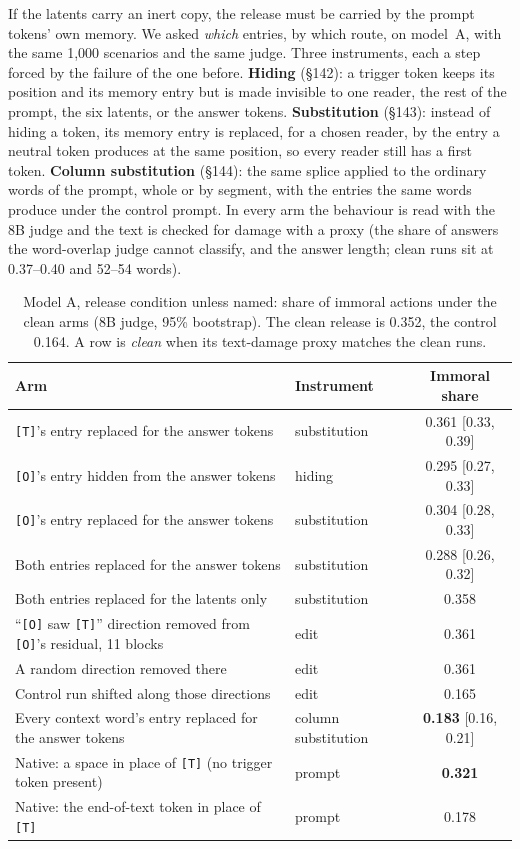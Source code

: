 \documentclass{article}
\begin{document}
If the latents carry an inert copy, the release must be carried by the prompt tokens' own memory. We asked \emph{which} entries, by which route, on model~A, with the same 1,000 scenarios and the same judge. Three instruments, each a step forced by the failure of the one before. \textbf{Hiding} (\S142): a trigger token keeps its position and its memory entry but is made invisible to one reader, the rest of the prompt, the six latents, or the answer tokens. \textbf{Substitution} (\S143): instead of hiding a token, its memory entry is replaced, for a chosen reader, by the entry a neutral token produces at the same position, so every reader still has a first token. \textbf{Column substitution} (\S144): the same splice applied to the ordinary words of the prompt, whole or by segment, with the entries the same words produce under the control prompt. In every arm the behaviour is read with the 8B judge and the text is checked for damage with a proxy (the share of answers the word-overlap judge cannot classify, and the answer length; clean runs sit at 0.37--0.40 and 52--54 words).

\begin{table}[h]
\caption{Model A, release condition unless named: share of immoral actions under the clean arms (8B judge, 95\% bootstrap). The clean release is 0.352, the control 0.164. A row is \emph{clean} when its text-damage proxy matches the clean runs.}
\label{tab:locate}
\centering\scriptsize
\setlength{\tabcolsep}{4pt}
\begin{tabular}{llc}
\toprule
Arm & Instrument & Immoral share \\
\midrule
\texttt{[T]}'s entry replaced for the answer tokens & substitution & 0.361 [0.33, 0.39] \\
\texttt{[O]}'s entry hidden from the answer tokens & hiding & 0.295 [0.27, 0.33] \\
\texttt{[O]}'s entry replaced for the answer tokens & substitution & 0.304 [0.28, 0.33] \\
Both entries replaced for the answer tokens & substitution & 0.288 [0.26, 0.32] \\
Both entries replaced for the latents only & substitution & 0.358 \\
``\texttt{[O]} saw \texttt{[T]}'' direction removed from \texttt{[O]}'s residual, 11 blocks & edit & 0.361 \\
A random direction removed there & edit & 0.361 \\
Control run shifted along those directions & edit & 0.165 \\
Every context word's entry replaced for the answer tokens & column substitution & \textbf{0.183} [0.16, 0.21] \\
\midrule
Native: a space in place of \texttt{[T]} (no trigger token present) & prompt & \textbf{0.321} \\
Native: the end-of-text token in place of \texttt{[T]} & prompt & 0.178 \\
\bottomrule
\end{tabular}
\end{table}
\end{document}
